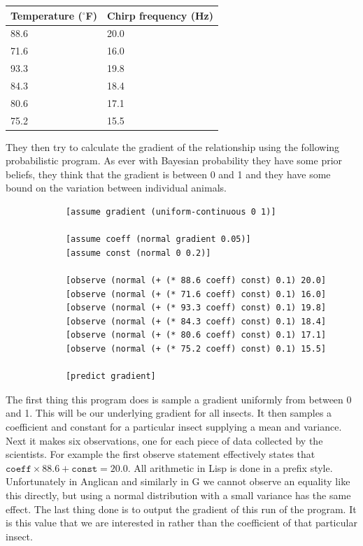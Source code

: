 \documentclass[a4paper]{article}
\begin{document}
\begin{center}
	\def\arraystretch{1.3}
	\begin{tabular}{l|l}
		Temperature (\(^\circ\)F) & Chirp frequency (Hz) \\
		\hline
		88.6 & 20.0 \\
		71.6 & 16.0 \\
		93.3 & 19.8 \\
		84.3 & 18.4 \\
		80.6 & 17.1 \\
		75.2 & 15.5
	\end{tabular}
\end{center}
They then try to calculate the gradient of the relationship using the following probabilistic program. As ever with Bayesian probability they have some prior beliefs, they think that the gradient is between 0 and 1 and they have some bound on the variation between individual animals.

\begin{center}
	\begin{varwidth}{\linewidth}
		\small
		\begin{verbatim}
			[assume gradient (uniform-continuous 0 1)]

			[assume coeff (normal gradient 0.05)]
			[assume const (normal 0 0.2)]

			[observe (normal (+ (* 88.6 coeff) const) 0.1) 20.0]
			[observe (normal (+ (* 71.6 coeff) const) 0.1) 16.0]
			[observe (normal (+ (* 93.3 coeff) const) 0.1) 19.8]
			[observe (normal (+ (* 84.3 coeff) const) 0.1) 18.4]
			[observe (normal (+ (* 80.6 coeff) const) 0.1) 17.1]
			[observe (normal (+ (* 75.2 coeff) const) 0.1) 15.5]

			[predict gradient]
		\end{verbatim}
	\end{varwidth}
\end{center}
The first thing this program does is sample a gradient uniformly from between 0 and 1. This will be our underlying gradient for all insects. It then samples a coefficient and constant for a particular insect supplying a mean and variance. Next it makes six observations, one for each piece of data collected by the scientists. For example the first observe statement effectively states that \(\texttt{coeff} \times 88.6 + \texttt{const} = 20.0\). All arithmetic in Lisp is done in a prefix style. Unfortunately in Anglican and similarly in G we cannot observe an equality like this directly, but using a normal distribution with a small variance has the same effect. The last thing done is to output the gradient of this run of the program. It is this value that we are interested in rather than the coefficient of that particular insect.
\end{document}
